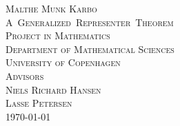 \clearpage
\thispagestyle{empty}

\begin{titlingpage}
	\vspace*{5.5cm}
	\noindent
	{\large\textsc{Malthe Munk Karbo}}\\[0.5cm]
	{\large\textsc{\mbox{A Generalized Representer Theorem}}}\\[0.1cm]
	\vfill\noindent
	{\large\textsc{Project in Mathematics}}\\[0.2cm]
	\noindent
	{\large\textsc{Department of Mathematical Sciences}}\\[0.2cm]
	\noindent
	{\large\textsc{University of Copenhagen}}\\[1cm]
	{\large\textsc{Advisors \\[0.2cm] {\Large Niels Richard Hansen}\\ [0.2cm] {\Large Lasse Petersen}}}\\[1cm]
	{\large\textsc{\today}}
	\let\cleardoublepage\clearpage
\end{titlingpage}
\normalfont
\restoregeometry
\cleardoublepage
